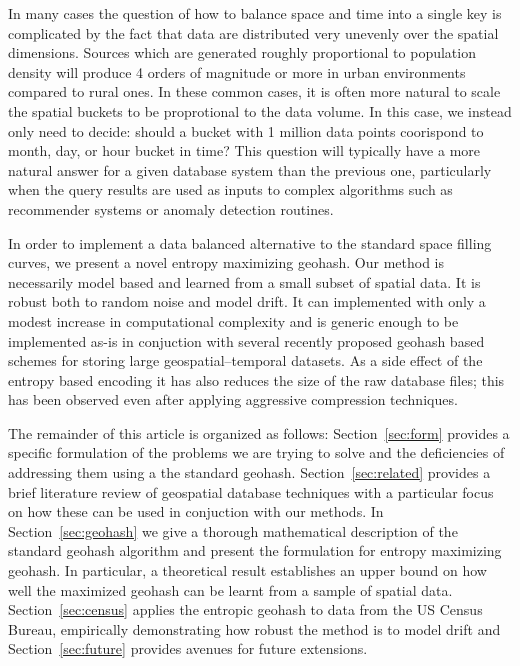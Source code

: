\documentclass[nips13submit_09,times,art10]{article} %
\begin{document}
In many cases the question of how to balance space and time into a single key is complicated
by the fact that data are distributed very unevenly over the spatial dimensions. Sources
which are generated roughly proportional to population density will produce 4 orders of
magnitude or more in urban environments compared to rural ones. In these common cases, it
is often more natural to scale the spatial buckets to be proprotional to the data volume.
In this case, we instead only need to decide: should a bucket with 1 million data points
coorispond to month, day, or hour bucket in time? This question will typically have a more
natural answer for a given database system than the previous one, particularly when the
query results are used as inputs to complex algorithms such as recommender systems or
anomaly detection routines.

In order to implement a data balanced alternative to the standard space filling curves,
we present a novel entropy maximizing geohash. Our method is necessarily model based and
learned from a small subset of spatial data. It is robust both to random noise and
model drift. It can implemented with only a modest increase in computational complexity
and is generic enough to be implemented as-is in conjuction with several recently
proposed geohash based schemes for storing large geospatial--temporal datasets. As a
side effect of the entropy based encoding it has also reduces the size of the raw database
files; this has been observed even after applying aggressive compression techniques.

The remainder of this article is organized as follows: Section~\ref{sec:form}
provides a specific formulation of the problems we are trying to solve and the
deficiencies of addressing them using a the standard geohash.
Section~\ref{sec:related} provides a brief literature review of geospatial
database techniques with a particular focus on how these can be used in conjuction
with our methods.
In Section~\ref{sec:geohash} we give a thorough mathematical description of the standard
geohash algorithm and present the formulation for entropy maximizing geohash.
In particular, a theoretical result establishes an upper bound on how well the
maximized geohash can be learnt from a sample of spatial data. Section~\ref{sec:census} applies the
entropic geohash to data from the US Census Bureau, empirically
demonstrating how robust the method is to model drift and Section~\ref{sec:future}
provides avenues for future extensions.
\end{document}
